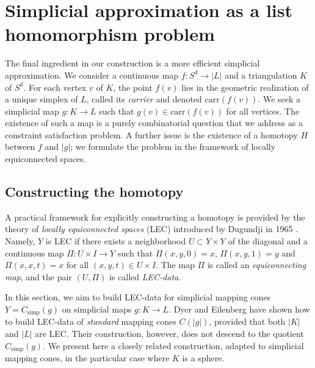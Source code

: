\documentclass[a4paper,english,cleveref,autoref,thm-restate,nolineno]{socg-lipics-v2021}
\newcommand{\geomreal}[1] { |#1| } %
\newcommand{\carr}[1] { \mathrm{carr}(#1) } %
\newcommand{\conesimp}[1] { C_\mathrm{simp}(#1) } %
\newcommand{\cone}[1] { C(#1) } %
\newif\iffullversion
\newcommand{\fullonly}[1]{\iffullversion #1\fi}
\begin{document}
\fullonly{
An illustration of \Cref{lem:raydescendstoquotient} is given in \Cref{fig:apothem_normalization_1}.
Suppose the vertices $0'$ and $1'$ are identified in the quotient.
In this case, all points on the dashed grey line are identified.
Accordingly, the corresponding partial ray segments through these points coincide in the quotient.
Note that this need not hold for the initial portions of the rays emanating from the origin.
Indeed, the radial rays intersect the edge $[1,0']$ at different points.
}

\section{Simplicial approximation as a list homomorphism problem}
\label{sec:approximation}

The final ingredient in our construction is a more efficient simplicial approximation. 
We consider a continuous map $f \colon S^d \to \geomreal{L}$ and a triangulation $K$ of $S^d$.
For each vertex $v$ of $K$, the point $f(v)$ lies in the geometric realization of a unique simplex of $L$, called its \emph{carrier} and denoted $\carr{f(v)}$.
We seek a simplicial map $g\colon K\to L$ such that $g(v)\in\carr{f(v)}$ for all vertices.
The existence of such a map is a purely combinatorial question that we address as a constraint satisfaction problem.
A further issue is the existence of a homotopy $H$ between $f$ and $\geomreal{g}$; we formulate the problem in the framework of locally equiconnected spaces.

\subsection{Constructing the homotopy}
\label{subsec:lec}

A practical framework for explicitly constructing a homotopy is provided by the theory of \textit{locally equiconnected spaces} (LEC) introduced by Dugundji in 1965 \cite{dugundji_locally_1965}.
Namely, $Y$ is LEC if there exists a neighborhood $U\subset Y\times Y$ of the diagonal and a continuous map $\Pi\colon U \times I \to Y$ such that $\Pi(x,y,0)=x$, $\Pi(x,y,1)=y$ and $\Pi(x,x,t)=x$ for all $(x,y,t) \in U\times I$.
The map $\Pi$ is called an \emph{equiconnecting map}, and the pair $(U,\Pi)$ is called \emph{LEC-data}.

In this section, we aim to build LEC-data for simplicial mapping cones $Y=\conesimp{g}$ on simplicial maps $g\colon K\to L$.
Dyer and Eilenberg \cite{dyer_adjunction_1972} have shown how to build LEC-data of \textit{standard} mapping cones $\cone{\geomreal{g}}$, provided that both $\geomreal{K}$ and $\geomreal{L}$ are LEC.
Their construction, however, does not descend to the quotient $\conesimp{g}$.
We present here a closely related construction, adapted to simplicial mapping cones, in the particular case where $K$ is a sphere.
\end{document}

